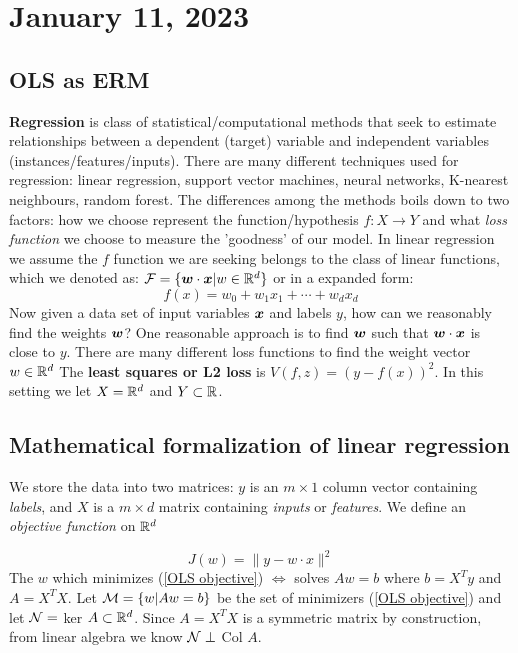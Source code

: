 \section{January 11, 2023}
\subsection{OLS as ERM}
\textbf{Regression} is class of statistical/computational methods that seek to estimate relationships between a dependent (target) variable and independent variables (instances/features/inputs).
There are many different techniques used for regression: linear regression, support vector machines, neural networks, K-nearest neighbours, random forest.
The differences among the methods boils down to two factors: how we choose represent the function/hypothesis $f: X \to Y$ and what \textit{loss function} we choose to measure the 'goodness' of our model. 
In linear regression we assume the $f$ function we are seeking belongs to the class of linear functions, which we denoted as:  $\mathcal F = \{\boldsymbol{w} \cdot \boldsymbol{x} | w \in \mathbb R^d \}$ or in a expanded form:
$$
f(x) = w_0 + w_1 x_1 + \cdots + w_d x_d
$$
Now given a data set of input variables $\boldsymbol{x}$ and labels $y$, how can we reasonably find the weights $\boldsymbol{w}$? One reasonable approach is to find $\boldsymbol{w}$ such that $\boldsymbol{w} \cdot \boldsymbol{x}$ is close to $y$.
There are many different loss functions to find the weight vector $w \in \mathbb R^d$
The \textbf{least squares or L2 loss} is $V(f,z) = (y - f(x))^2$. In this setting  we let $X = \mathbb R^d$ and $Y \subset \mathbb R$. 
\subsection{Mathematical formalization of linear regression}
We store the data into two matrices: $y$ is an $m \times 1$ column vector containing \textit{labels}, and $X$ is a $m \times d$ matrix containing \textit{inputs} or \textit{features}. We define an \textit{objective function} on $\mathbb R^d$

\begin{equation}\label{OLS objective}
    J(w) = \parallel y - w\cdot x \parallel^2
\end{equation}
The $w$ which minimizes (\ref{OLS objective}) $\Leftrightarrow$ solves $Aw = b$ where $b = X^Ty$ and $A = X^TX$. 
Let $\mathcal M = \{w|Aw =b \}$ be the set of minimizers (\ref{OLS objective}) and let 
$\mathcal N =$ ker $A \subset \mathbb R^d$. Since $A = X^TX$ is a symmetric matrix by construction, from linear algebra we know  $\mathcal N \perp$ Col $A$.



